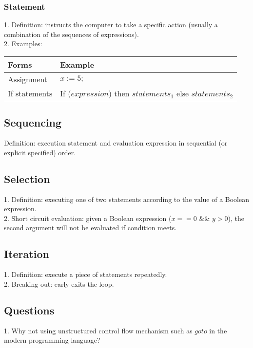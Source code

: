 \documentclass[11pt]{article}
\begin{document}
\subsubsection{Statement}
1. Definition: instructs the computer to take a specific action (usually a combination of the sequences of expressions).\\
2. Examples:\\
\begin{center}
\begin{tabular}{ |l|l|} 
 \hline
 Forms & Example \\ 
  \hline
 Assignment & $x:=5;$ \\ 
  \hline
 If statements & If ($expression$) then $statements_1$ else $statements_2$\\ 
 \hline
\end{tabular}
\end{center}
\subsection{Sequencing}
Definition: execution statement and evaluation expression in sequential (or explicit specified) order.
\subsection{Selection}
1. Definition: executing one of two statements according to the value of a Boolean expression.\\
2. Short circuit evaluation: given a Boolean expression ($x == 0$ \&\& $y > 0$), the second argument will not be evaluated if condition meets.
\subsection{Iteration}
1. Definition: execute a piece of statements repeatedly.\\
2. Breaking out: early exits the loop.\\
\subsection{Questions}
1. Why not using unstructured control flow mechanism such as $goto$ in the modern programming language?
\end{document}
